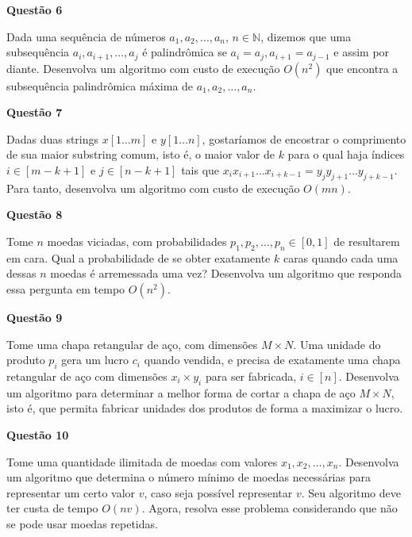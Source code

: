 \documentclass[]{article}
\begin{document}
\pagebreak

\vspace{\baselineskip}

\textbf{Questão 6}

Dada uma sequência de números $a_1, a_2, \dots, a_n$,
$n \in \mathbb{N}$, dizemos que uma subsequência
$a_i, a_{i + 1}, \dots, a_j$ é palindrômica se
$a_i = a_j, a_{i + 1} = a_{j - 1}$ e assim por diante.  Desenvolva um
algoritmo com custo de execução $O(n^2)$ que encontra a subsequência
palindrômica máxima de $a_1, a_2, \dots, a_n$.

\vspace{\baselineskip}

\textbf{Questão 7}

Dadas duas strings $x[1 \dots m]$ e $y[1 \dots n]$, gostaríamos de
encostrar o comprimento de sua maior substring comum, isto é, o maior
valor de $k$ para o qual haja índices $i \in [m - k + 1]$ e
$j \in [n - k + 1]$ tais que
$x_ix_{i + 1} \dots x_{i + k - 1} = y_jy_{j + 1} \dots y_{j + k - 1}$.
Para tanto, desenvolva um algoritmo com custo de execução $O(mn)$.

\vspace{\baselineskip}

\textbf{Questão 8}

Tome $n$ moedas viciadas, com probabilidades
$p_1, p_2, \dots, p_n \in [0, 1]$ de resultarem em cara.  Qual a
probabilidade de se obter exatamente $k$ caras quando cada uma dessas
$n$ moedas é arremessada uma vez?  Desenvolva um algoritmo que
responda essa pergunta em tempo $O(n^2)$.

\vspace{\baselineskip}

\textbf{Questão 9}

Tome uma chapa retangular de aço, com dimensões $M \times N$.  Uma
unidade do produto $p_i$ gera um lucro $c_i$ quando vendida, e precisa
de exatamente uma chapa retangular de aço com dimensões
$x_i \times y_i$ para ser fabricada, $i \in [n]$.  Desenvolva um
algoritmo para determinar a melhor forma de cortar a chapa de aço
$M \times N$, isto é, que permita fabricar unidades dos produtos de
forma a maximizar o lucro.

\vspace{\baselineskip}

\textbf{Questão 10}

Tome uma quantidade ilimitada de moedas com valores
$x_1, x_2, \dots, x_n$.  Desenvolva um algoritmo que determina o
número mínimo de moedas necessárias para representar um certo valor
$v$, caso seja possível representar $v$.  Seu algoritmo deve ter custa
de tempo $O(nv)$.  Agora, resolva esse problema considerando que não
se pode usar moedas repetidas.
\end{document}
